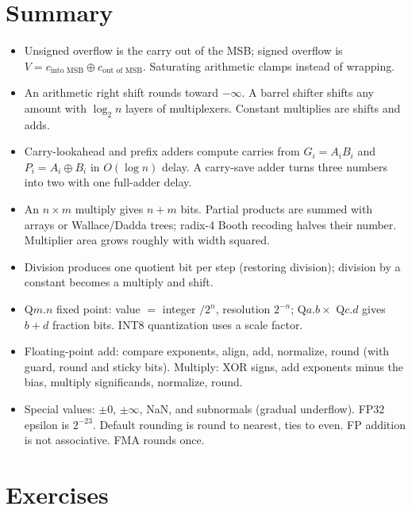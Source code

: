 \section{Summary}

\begin{itemize}
  \item Unsigned overflow is the carry out of the MSB; signed overflow is $V = c_{\text{into MSB}} \oplus c_{\text{out of MSB}}$. Saturating arithmetic clamps instead of wrapping.
  \item An arithmetic right shift rounds toward $-\infty$. A barrel shifter shifts any amount with $\log_2 n$ layers of multiplexers. Constant multiplies are shifts and adds.
  \item Carry-lookahead and prefix adders compute carries from $G_i = A_iB_i$ and $P_i = A_i \oplus B_i$ in $O(\log n)$ delay. A carry-save adder turns three numbers into two with one full-adder delay.
  \item An $n \times m$ multiply gives $n + m$ bits. Partial products are summed with arrays or Wallace/Dadda trees; radix-4 Booth recoding halves their number. Multiplier area grows roughly with width squared.
  \item Division produces one quotient bit per step (restoring division); division by a constant becomes a multiply and shift.
  \item Q$m$.$n$ fixed point: value $=$ integer $/2^n$, resolution $2^{-n}$; Q$a$.$b \times$ Q$c$.$d$ gives $b + d$ fraction bits. INT8 quantization uses a scale factor.
  \item Floating-point add: compare exponents, align, add, normalize, round (with guard, round and sticky bits). Multiply: XOR signs, add exponents minus the bias, multiply significands, normalize, round.
  \item Special values: $\pm 0$, $\pm\infty$, NaN, and subnormals (gradual underflow). FP32 epsilon is $2^{-23}$. Default rounding is round to nearest, ties to even. FP addition is not associative. FMA rounds once.
\end{itemize}

\section{Exercises}

